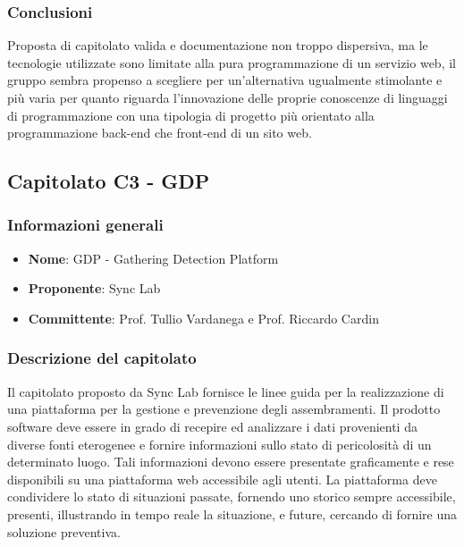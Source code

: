		\subsubsection{Conclusioni}
			Proposta di capitolato valida e documentazione non troppo dispersiva, ma le tecnologie utilizzate sono limitate alla pura programmazione di un servizio web, il gruppo sembra propenso a scegliere per un’alternativa ugualmente stimolante e più varia per quanto riguarda l’innovazione delle proprie conoscenze di linguaggi di programmazione con una tipologia di progetto più orientato alla programmazione back-end che front-end di un sito web.
\newpage
				
	\subsection{Capitolato C3 - GDP}
		\subsubsection{Informazioni generali}
			\begin{itemize}
				\item\textbf{Nome}: GDP - Gathering Detection Platform
				\item\textbf{Proponente}: Sync Lab
				\item\textbf{Committente}: Prof. Tullio Vardanega e Prof. Riccardo Cardin
			\end{itemize}
			
		\subsubsection{Descrizione del capitolato}
			Il capitolato proposto da Sync Lab fornisce le linee guida per la realizzazione di una piattaforma per la gestione e prevenzione degli assembramenti. 
			Il prodotto software deve essere in grado di recepire ed analizzare i dati provenienti da diverse fonti eterogenee e fornire informazioni sullo stato di pericolosità di un determinato luogo.
			Tali informazioni devono essere presentate graficamente e rese disponibili su una piattaforma web accessibile agli utenti. La piattaforma deve condividere lo stato di situazioni passate, fornendo uno storico sempre accessibile, presenti, illustrando in tempo reale la situazione, e future, cercando di fornire una soluzione preventiva.
